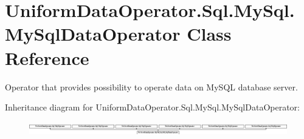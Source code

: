\hypertarget{class_uniform_data_operator_1_1_sql_1_1_my_sql_1_1_my_sql_data_operator}{}\section{Uniform\+Data\+Operator.\+Sql.\+My\+Sql.\+My\+Sql\+Data\+Operator Class Reference}
\label{class_uniform_data_operator_1_1_sql_1_1_my_sql_1_1_my_sql_data_operator}


Operator that provides possibility to operate data on My\+S\+QL database server.  


Inheritance diagram for Uniform\+Data\+Operator.\+Sql.\+My\+Sql.\+My\+Sql\+Data\+Operator\+:\begin{figure}[H]
\begin{center}
\leavevmode
\includegraphics[height=0.590717cm]{d5/d34/class_uniform_data_operator_1_1_sql_1_1_my_sql_1_1_my_sql_data_operator}
\end{center}
\end{figure}
